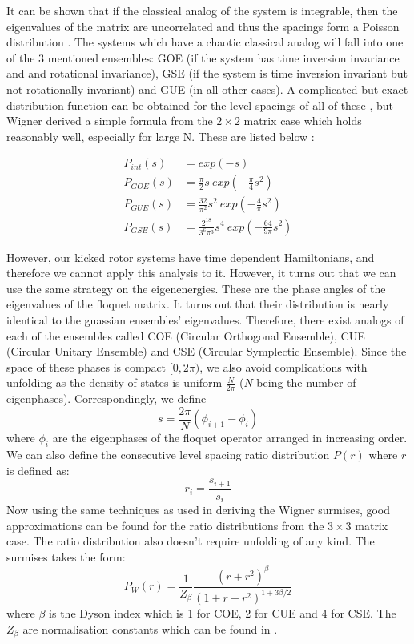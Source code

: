 \documentclass[twocolumn]{report}
\begin{document}
It can be shown that if the classical analog of the system is integrable,
then the eigenvalues of the matrix are uncorrelated and thus the spacings
form a Poisson distribution \cite{stockmann}\cite{mehta_random_2004}. The
systems which have a chaotic classical analog will fall into one of the 3
mentioned ensembles: GOE (if the system has time inversion invariance and
and rotational invariance), GSE (if the system is time inversion invariant
but not rotationally invariant) and GUE (in all other cases). A complicated
but exact distribution function can be obtained for the level spacings of
all of these \cite{mehta_random_2004}, but Wigner derived a simple formula
from the $2 \times 2$ matrix case which holds reasonably well, especially
for large N. These are listed below \cite{stockmann}:

\begin{align}
    P_{int}(s) &= exp(-s)\\
    P_{GOE}(s) &= \frac{\pi}{2} s\ exp\left(-\frac{\pi}{4}s^2\right)\\
    P_{GUE}(s) &= \frac{32}{\pi^2} s^2\ exp\left(-\frac{4}{\pi}s^2\right)\\
    P_{GSE}(s) &= \frac{2^{18}}{3^6 \pi^3} s^4\ exp\left(-\frac{64}{9\pi}s^2\right)
\end{align}

However, our kicked rotor systems have time dependent Hamiltonians, and
therefore we cannot apply this analysis to it. However, it turns out that
we can use the same strategy on the eigenenergies. These are the phase
angles of the eigenvalues of the floquet matrix. It turns out that their
distribution is nearly identical to the guassian ensembles' eigenvalues.
Therefore, there exist analogs of each of the ensembles called COE
(Circular Orthogonal Ensemble), CUE (Circular Unitary Ensemble) and
CSE (Circular Symplectic Ensemble). Since the space of these phases is
compact $[0, 2\pi)$, we also avoid complications with unfolding as the
density of states is uniform $\frac{N}{2\pi}$ ($N$ being the number
of eigenphases). Correspondingly, we define
\begin{equation}
    s = \frac{2\pi}{N} (\phi_{i+1} - \phi_i)
\end{equation}
where $\phi_i$ are the eigenphases of the floquet operator arranged in
increasing order. We can also define the consecutive level spacing ratio
distribution $P(r)$ where $r$ is defined as:
\begin{equation}
    r_i = \frac{s_{i+1}}{s_i}
\end{equation}
Now using the same techniques as used in deriving the Wigner surmises,
good approximations can be found for the ratio distributions from the
$3 \times 3$ matrix case. The ratio distribution also doesn't require
unfolding of any kind. The surmises takes the form\cite{atas_distribution_2013}:
\begin{equation}
    P_W(r) = \frac{1}{Z_\beta}
    \frac{(r + r^2)^\beta}{(1 + r + r^2)^{1 + 3\beta/2}}
\end{equation}
where $\beta$ is the Dyson index which is 1 for COE, 2 for CUE and 4
for CSE. The $Z_\beta$ are normalisation constants which can be found
in \cite{atas_distribution_2013}.
\end{document}
